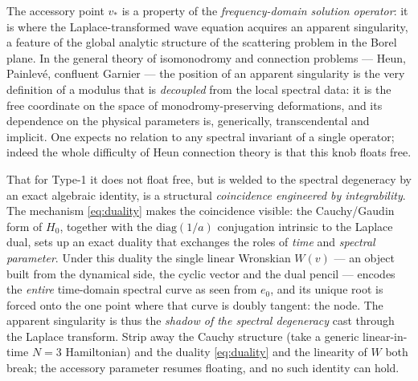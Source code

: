\documentclass[aps,prl,reprint,nofootinbib,superscriptaddress]{revtex4-2}
\newcommand{\diag}{\mathrm{diag}}
\begin{document}
The accessory point $v_*$ is a property of the \emph{frequency-domain solution operator}: it is where
the Laplace-transformed wave equation acquires an apparent singularity, a feature of the global
analytic structure of the scattering problem in the Borel plane. In the general theory of
isomonodromy and connection problems --- Heun, Painlev\'e, confluent Garnier --- the position of an
apparent singularity is the very definition of a modulus that is \emph{decoupled} from the local
spectral data: it is the free coordinate on the space of monodromy-preserving deformations, and its
dependence on the physical parameters is, generically, transcendental and implicit. One expects no
relation to any spectral invariant of a single operator; indeed the whole difficulty of Heun
connection theory is that this knob floats free.

That for Type-1 it does not float free, but is welded to the spectral degeneracy by an exact
algebraic identity, is a structural \emph{coincidence engineered by integrability}. The mechanism
\eqref{eq:duality} makes the coincidence visible: the Cauchy/Gaudin form of $H_0$, together with the
$\diag(1/a)$ conjugation intrinsic to the Laplace dual, sets up an exact duality that exchanges the
roles of \emph{time} and \emph{spectral parameter}. Under this duality the single linear Wronskian
$W(v)$ --- an object built from the dynamical side, the cyclic vector and the dual pencil --- encodes
the \emph{entire} time-domain spectral curve as seen from $e_0$, and its unique root is forced onto the
one point where that curve is doubly tangent: the node. The apparent singularity is thus the
\emph{shadow of the spectral degeneracy} cast through the Laplace transform. Strip away the Cauchy
structure (take a generic linear-in-time $N{=}3$ Hamiltonian) and the duality \eqref{eq:duality} and the
linearity of $W$ both break; the accessory parameter resumes floating, and no such identity can hold.
\end{document}
